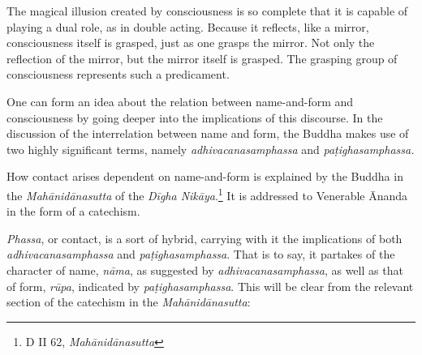 The magical illusion created by consciousness is so complete that it is capable of playing a dual role, as in double acting. Because it reflects, like a mirror, consciousness itself is grasped, just as one grasps the mirror. Not only the reflection of the mirror, but the mirror itself is grasped. The grasping group of consciousness represents such a predicament.

One can form an idea about the relation between name-and-form and consciousness by going deeper into the implications of this discourse. In the discussion of the interrelation between name and form, the Buddha makes use of two highly significant terms, namely \emph{adhivacanasamphassa} and \emph{paṭighasamphassa.}

How contact arises dependent on name-and-form is explained by the Buddha in the \emph{Mahānidānasutta} of the \emph{Dīgha Nikāya}.\footnote{D II 62, \emph{Mahānidānasutta}} It is addressed to Venerable Ānanda in the form of a catechism.

\emph{Phassa}, or contact, is a sort of hybrid, carrying with it the implications of both \emph{adhivacanasamphassa} and \emph{paṭighasamphassa}. That is to say, it partakes of the character of name, \emph{nāma}, as suggested by \emph{adhivacanasamphassa}, as well as that of form, \emph{rūpa}, indicated by \emph{paṭighasamphassa}. This will be clear from the relevant section of the catechism in the \emph{Mahānidānasutta}:

